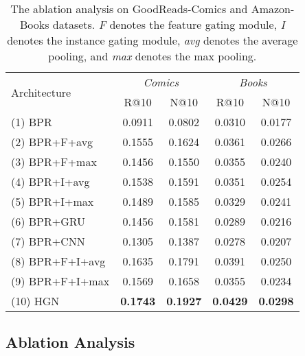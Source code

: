 \documentclass[sigconf]{acmart}
\begin{document}
\begin{table}[ht]
\centering
\caption{\label{tab:ablation_analysis}The ablation analysis on GoodReads-Comics and Amazon-Books datasets. \textit{F} denotes the feature gating module, \textit{I} denotes the instance gating module, \textit{avg} denotes the average pooling, and \textit{max} denotes the max pooling.}
\begin{tabular}{ |l|c|c|c|c| }
\hline
\multirow{2}{*}{Architecture} & \multicolumn{2}{c|}{\textit{Comics}} & \multicolumn{2}{c|}{\textit{Books}} \bigstrut \\\cline{2-5} 
& R@10 & N@10 & R@10 & N@10 \bigstrut \\ 
\hline
(1) BPR & 0.0911 & 0.0802 & 0.0310 & 0.0177 \\
(2) BPR+F+avg & 0.1555 & 0.1624 & 0.0361 & 0.0266 \\
(3) BPR+F+max & 0.1456 & 0.1550 & 0.0355 & 0.0240 \\
(4) BPR+I+avg & 0.1538 & 0.1591 & 0.0351 & 0.0254 \\
(5) BPR+I+max & 0.1489 & 0.1585 & 0.0329 & 0.0241 \\
(6) BPR+GRU & 0.1456 & 0.1581 & 0.0289 & 0.0216 \\
(7) BPR+CNN & 0.1305 & 0.1387 & 0.0278 & 0.0207 \\
(8) BPR+F+I+avg & 0.1635 & 0.1791 & 0.0391 & 0.0250 \\
(9) BPR+F+I+max & 0.1569 & 0.1658 & 0.0355 & 0.0234 \\
(10) HGN & \textbf{0.1743} & \textbf{0.1927} & \textbf{0.0429} & \textbf{0.0298} \\
\hline
\end{tabular}
\vspace{-0.3cm}
\end{table}

\subsection{Ablation Analysis} \label{sec:ablation}
\end{document}
